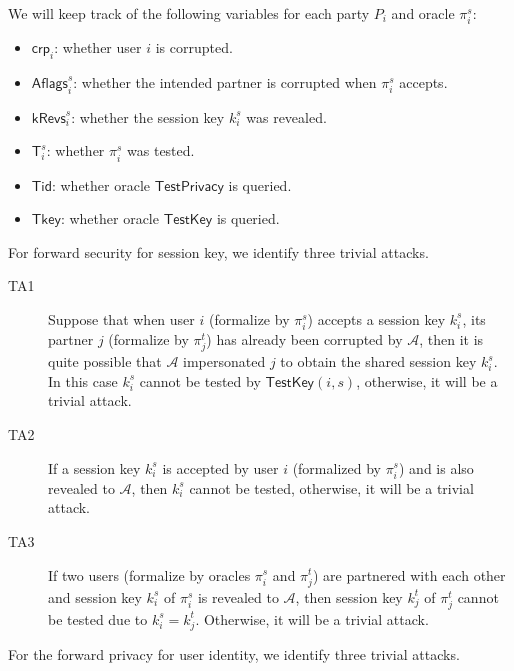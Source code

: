 \documentclass[a4paper,11pt]{article}
\begin{document}
\begin{sloppypar}
We will keep track of the following variables for each party $P_i$ and oracle $\pi^s_i$:
\begin{itemize}
    \item $\mathsf{crp}_i$: whether user $i$ is corrupted.
    \item $\mathsf{Aflags}^s_i$: whether the intended partner is corrupted when $\pi^s_i$ accepts.
    \item $\mathsf{kRevs}^s_i$: whether the session key $k^s_i$ was revealed.
    \item $\mathsf{T}^s_i$: whether $\pi^s_i$ was tested.
    \item $\mathsf{Tid}$: whether oracle $\mathsf{TestPrivacy}$ is queried.
    \item $\mathsf{Tkey}$: whether oracle $\mathsf{TestKey}$ is queried.
\end{itemize}

For forward security for session key, we identify three trivial attacks.

\begin{description}
    \item[TA1] Suppose that when user $i$ (formalize by $\pi^s_i$) accepts a session key $k^s_i$, its partner $j$ (formalize by $\pi^t_j$) has already been corrupted by $\mathcal{A}$, then it is quite possible that $\mathcal{A}$ impersonated $j$ to obtain the shared session key $k^s_i$. In this case $k^s_i$ cannot be tested by $\mathsf{TestKey}(i, s)$, otherwise, it will be a trivial attack.
    \item[TA2] If a session key $k^s_i$ is accepted by user $i$ (formalized by $\pi^s_i$) and is also revealed to $\mathcal{A}$, then $k^s_i$ cannot be tested, otherwise, it will be a trivial attack.
    \item[TA3] If two users (formalize by oracles $\pi^s_i$ and $\pi^t_j$) are partnered with each other and session key $k^s_i$ of $\pi^s_i$ is revealed to $\mathcal{A}$, then session key $k^t_j$ of $\pi^t_j$ cannot be tested due to $k^s_i = k^t_j$. Otherwise, it will be a trivial attack.
\end{description}

For the forward privacy for user identity, we identify three trivial attacks.


\end{sloppypar}
\end{document}
